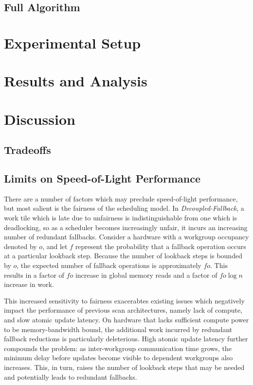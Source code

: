 \documentclass[sigconf]{acmart}
\begin{document}
\subsection{Full Algorithm}

\section{Experimental Setup}

\section{Results and Analysis}

\section{Discussion}

\subsection{Tradeoffs}

\subsection{Limits on Speed-of-Light Performance}
There are a number of factors which may preclude speed-of-light performance, but most salient is the fairness of the scheduling model. In \emph{Decoupled-Fallback}, a work tile which is late due to unfairness is indistinguishable from one which is deadlocking, so as a scheduler becomes increasingly unfair, it incurs an increasing number of redundant fallbacks. Consider a hardware with a workgroup occupancy denoted by $o$, and let $f$ represent the probability that a fallback operation occurs at a particular lookback step. Because the number of lookback steps is bounded by $o$, the expected number of fallback operations is approximately $fo$. This results in a factor of $fo$ increase in global memory reads and a factor of $fo\log{n}$ increase in work.

This increased sensitivity to fairness exacerabtes existing issues which negatively impact the performance of previous scan architectures, namely lack of compute, and slow atomic update latency. On hardware that lacks sufficient compute power to be memory-bandwidth bound, the additional work incurred by redundant fallback reductions is particularly deleterious. High atomic update latency further compounds the problem: as inter-workgroup communication time grows, the minimum delay before updates become visible to dependent workgroups also increases. This, in turn, raises the number of lookback steps that may be needed and potentially leads to redundant fallbacks.
\end{document}
